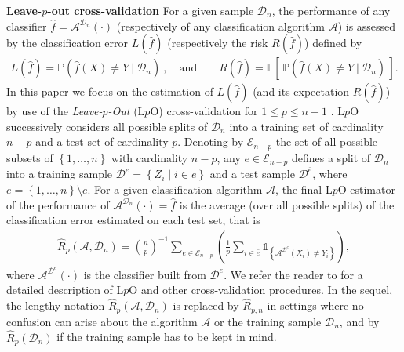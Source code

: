 \documentclass[twoside,11pt]{article}
\numberwithin{equation}{section}
\newcommand{\probc}[2]{\mathbb{P}\left(#1 \ | \ #2 \right)}
\newcommand{\som}[2]{\sum_{#1}^{#2}}
\newcommand{\ga}[1]{\left\{#1\right\}}
\newcommand{\1}{\mathds{1}}%
\newcommand{\ind}[1]{\1_{\ga{#1}}}%
\newcommand{\paren}[1]{\left( #1 \right)}
\newcommand{\croch}[1]{\left[\, #1 \,\right]}
\newcommand{\acc}[1]{\left\{ #1 \right\}}
\newcommand{\E}{\mathbb{E}}
\newcommand{\D}{\mathcal{D}}
\newcommand{\Dn}{\mathcal{D}_n}
\newcommand{\De}{\mathcal{D}^e}
\newcommand{\Deb}{\mathcal{D}^{\bar e}}
\newcommand{\A}{\mathcal{A}}
\newcommand{\Enp}{\mathcal{E}_{n-p}}
\numberwithin{equation}{section}
\theoremstyle{plain}
\begin{document}
\noindent\textbf{Leave-$p$-out cross-validation}
For a given sample $\D_n$, the performance of any classifier $\hat f=\A^{\Dn}(\cdot)$ (respectively of any classification algorithm $\A$) is assessed by the classification error $L(\hat f)$ (respectively the risk $R(\hat f)$) defined by
\begin{eqnarray*}
L(\hat{f}) = \probc{\hat{f}(X) \neq Y}{\D_n}\ , \quad \mbox{and}\qquad R(\hat{f}) = \E\croch{\probc{\hat{f}(X) \neq Y}{\D_n}}  .
\end{eqnarray*}
In this paper we focus on the estimation of $L(\hat f)$ (and its expectation $R(\hat f)$) by use of the \emph{Leave-$p$-Out} (L$p$O) cross-validation for $1\leq p\leq n-1$ \citep{Zha:1993,CeRo08}.
%
L$p$O successively considers all possible splits of $\D_n$ into a training set of cardinality $n-p$ and a test set of cardinality $p$.
%
Denoting by $\Enp$
the set of all possible subsets of $\acc{1,\ldots,n}$ with cardinality $n-p$, any $e\in\Enp$ defines a split of $\D_n$ into a training sample $\De=\acc{Z_i \mid i\in e}$ and a test sample $\Deb$, where $\bar e = \acc{1,\ldots,n}\setminus e$.
%
For a given classification algorithm $\A$, the final L$p$O estimator of the performance of $\A^{\D_n}(\cdot) = \widehat f$ is the average (over all possible splits) of the classification error estimated on each test set, that is
\begin{eqnarray}\label{def.Lpo.estimator}
\widehat{R}_{p}( \A,\D_n) = {n\choose p}^{-1}\som{e\in\mathcal{E}_{n-p}}{} \paren{\frac{1}{p}\som{i\in\bar{e}}{}\ind{ \A^{\De}\paren{X_i}\neq Y_i} } ,
\end{eqnarray}
where $\A^{\De}\paren{ \cdot}$ is the classifier built from $\De$.
%
We refer the reader to \cite{ArCe_2010_survey} for a detailed description of L$p$O and other cross-validation procedures.
%
In the sequel, the lengthy notation $\widehat{R}_{p}( \A,\D_n) $ is replaced by $\widehat{R}_{p,n}$ in settings where no confusion can arise about the algorithm $\A$ or the training sample $\Dn$, and by  $\widehat{R}_{p}(\D_n) $ if the training sample has to be kept in mind.
\end{document}
